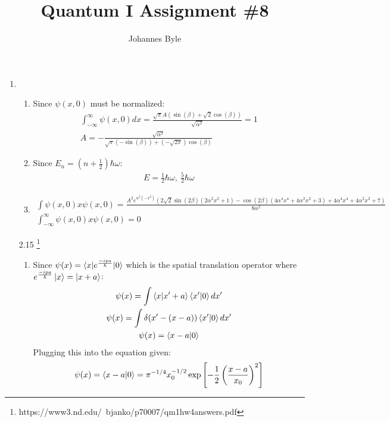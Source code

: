 \documentclass[10pt]{article}
\title{Quantum I Assignment \#8}
\author{Johannes Byle}
\begin{document}
  \maketitle
  \begin{enumerate}
    \item
    \begin{enumerate}
      \item Since $\psi(x,0)$ must be normalized:
      \begin{gather*}
        \int_{-\infty}^{\infty}\psi(x,0)dx=\frac{\sqrt{\pi } A \left(\sin (\beta )+\sqrt{2} \cos (\beta )\right)}{\sqrt{\alpha ^2}}=1\\
        A=-\frac{\sqrt{\alpha ^2}}{\sqrt{\pi } (-\sin (\beta ))+\left(-\sqrt{2 \pi }\right) \cos (\beta )}
      \end{gather*}
      \item Since $E_n=(n+\frac{1}{2})\hbar\omega$:
      \begin{gather*}
        E=\frac{1}{2}\hbar\omega,\ \frac{5}{2}\hbar\omega
      \end{gather*}
      \item
      \begin{gather*}
        \int\psi(x,0)x\psi(x,0)=\frac{A^2 e^{\alpha ^2 \left(-x^2\right)} \left(2 \sqrt{2} \sin (2 \beta ) \left(2 \alpha ^2 x^2+1\right)-\cos (2 \beta ) \left(4 \alpha ^4 x^4+4 \alpha ^2 x^2+3\right)+4 \alpha ^4 x^4+4 \alpha ^2 x^2+7\right)}{8 \alpha ^2}\\
        \int_{-\infty}^{\infty}\psi(x,0)x\psi(x,0)=0
      \end{gather*}
    \end{enumerate}
    \item[2.15]\footnote{https://www3.nd.edu/~bjanko/p70007/qm1hw4answers.pdf}
    \begin{enumerate}
      \item Since $\psi(x)=\braket{x|e^{\frac{-ipa}{\hbar}}|0}$ which is the spatial translation operator where $e^{\frac{-ipa}{\hbar}}\ket{x}=\ket{x+a}$:
      \begin{gather*}
        \psi(x)=\int\braket{x|x'+a}\braket{x'|0}dx'\\
        \psi(x)=\int\delta(x'-(x-a))\braket{x'|0}dx'\\
        \psi(x)=\braket{x-a|0}
      \end{gather*}
      Plugging this into the equation given:
      \begin{gather*}
        \psi(x)=\braket{x-a|0}=\pi^{-1/4}x_0^{-1/2}\exp\left[ -\frac{1}{2}\left( \frac{x-a}{x_0} \right)^2 \right]

\end{gather*}
\end{enumerate}
\end{enumerate}
\end{document}
